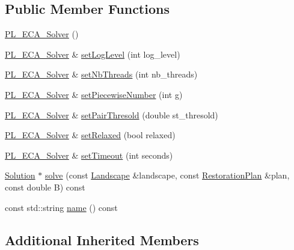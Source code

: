 \subsection*{Public Member Functions}
\begin{DoxyCompactItemize}
\item 
\hyperlink{class_p_l___e_c_a___solver_a2ceebca2d22969b3c1042b79e37ce903}{P\+L\+\_\+\+E\+C\+A\+\_\+\+Solver} ()
\item 
\hyperlink{class_p_l___e_c_a___solver}{P\+L\+\_\+\+E\+C\+A\+\_\+\+Solver} \& \hyperlink{class_p_l___e_c_a___solver_af6b396a9f4d322578f69ad923dbdfc81}{set\+Log\+Level} (int log\+\_\+level)
\item 
\hyperlink{class_p_l___e_c_a___solver}{P\+L\+\_\+\+E\+C\+A\+\_\+\+Solver} \& \hyperlink{class_p_l___e_c_a___solver_a3e0926b81d114ad8754993fe9be92122}{set\+Nb\+Threads} (int nb\+\_\+threads)
\item 
\hyperlink{class_p_l___e_c_a___solver}{P\+L\+\_\+\+E\+C\+A\+\_\+\+Solver} \& \hyperlink{class_p_l___e_c_a___solver_a8da17e87b79839cf35bfaa7a32dca1fd}{set\+Piecewise\+Number} (int g)
\item 
\hyperlink{class_p_l___e_c_a___solver}{P\+L\+\_\+\+E\+C\+A\+\_\+\+Solver} \& \hyperlink{class_p_l___e_c_a___solver_aa08191661fd734646fa916959cac5728}{set\+Pair\+Thresold} (double st\+\_\+thresold)
\item 
\hyperlink{class_p_l___e_c_a___solver}{P\+L\+\_\+\+E\+C\+A\+\_\+\+Solver} \& \hyperlink{class_p_l___e_c_a___solver_ac6c0a8cdb448c759ab706bac5eb857ba}{set\+Relaxed} (bool relaxed)
\item 
\hyperlink{class_p_l___e_c_a___solver}{P\+L\+\_\+\+E\+C\+A\+\_\+\+Solver} \& \hyperlink{class_p_l___e_c_a___solver_a17ca21ad3dd7336e51daddb1ca587389}{set\+Timeout} (int seconds)
\item 
\hyperlink{class_solution}{Solution} $\ast$ \hyperlink{class_p_l___e_c_a___solver_a7fe728bb23be76b4aa51e669b73ee10d}{solve} (const \hyperlink{class_landscape}{Landscape} \&landscape, const \hyperlink{class_restoration_plan}{Restoration\+Plan} \&plan, const double B) const
\item 
const std\+::string \hyperlink{class_p_l___e_c_a___solver_a4cbbcbfd62d91dacb448470456ac57c7}{name} () const
\end{DoxyCompactItemize}
\subsection*{Additional Inherited Members}


